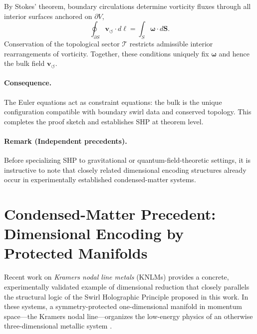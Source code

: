 \documentclass[11pt]{article}
\begin{document}
        By Stokes' theorem, boundary circulations determine vorticity fluxes through
        all interior surfaces anchored on $\partial V$,
        \begin{equation}
            \oint_{\partial S}\mathbf{v}_{\!\boldsymbol{\circlearrowleft}}\cdot
            d\boldsymbol{\ell}
            =
            \int_S \boldsymbol{\omega}\cdot d\mathbf{S}.
        \end{equation}
        Conservation of the topological sector $\mathcal{T}$ restricts admissible
        interior rearrangements of vorticity. Together, these conditions uniquely fix
        $\boldsymbol{\omega}$ and hence the bulk field
        $\mathbf{v}_{\!\boldsymbol{\circlearrowleft}}$.

    \paragraph{Consequence.}
        The Euler equations act as constraint equations: the bulk is the unique
        configuration compatible with boundary swirl data and conserved topology.
        This completes the proof sketch and establishes SHP at theorem level.

    \paragraph{Remark (Independent precedents).}
        Before specializing SHP to gravitational or quantum-field-theoretic
        settings, it is instructive to note that closely related dimensional
        encoding structures already occur in experimentally established
        condensed-matter systems.

    \section{Condensed-Matter Precedent: Dimensional Encoding by Protected Manifolds}
    \label{sec:knlm_precedent}


    Recent work on \emph{Kramers nodal line metals} (KNLMs) provides a concrete,
    experimentally validated example of dimensional reduction that closely
    parallels the structural logic of the Swirl Holographic Principle proposed
    in this work.
    In these systems, a symmetry-protected one-dimensional manifold in momentum
    space---the Kramers nodal line---organizes the low-energy physics of an
    otherwise three-dimensional metallic system
    \cite{Domaine2025NatCommOctdong,Xie2021KNLM}.
\end{document}
